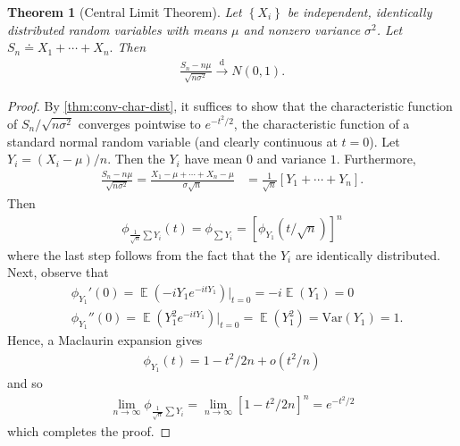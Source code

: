 \documentclass[12pt]{amsbook}
\DeclareMathOperator{\ex}{\mathbb{E}}
\newcommand{\var}{\mathrm{Var}}
\theoremstyle{plain}
\newtheorem{theorem}{Theorem}
\theoremstyle{definition}
\theoremstyle{remark}
\numberwithin{equation}{section}  %
\begin{document}
	\begin{theorem}[Central Limit Theorem]\label{thm:central-limit}
		Let $ \left\{ X_{i} \right\}$ be independent, identically
		distributed random variables with means $\mu$ and nonzero
		variance $\sigma^{2}$. Let $S_{n} \doteq X_{1} + \cdots + X_{n}.$ Then
		\begin{equation*}
			\begin{split}
				\frac{S_{n} - n \mu}{\sqrt{n \sigma^{2}}} \xrightarrow{\text{d}} N(0,1).
			\end{split}
		\end{equation*}
	\end{theorem}
	\begin{proof}
		By \cref{thm:conv-char-dist}, it suffices to show that
		the characteristic function of $S_{n}/\sqrt{n \sigma^{2}}$ converges
		pointwise to  $e^{-t^{2}/2}$, the characteristic function of 
		a standard normal random variable (and clearly
		continuous at $t=0$). Let
		$Y_{i} = (X_{i} - \mu)/n$. Then the $Y_{i}$ have mean $0$ and
		variance $1$. Furthermore, 
		\begin{equation*}
			\begin{split}
				\frac{S_{n} - n \mu}{\sqrt{n \sigma^{2}}}
				= \frac{X_{1} - \mu+ \cdots + X_{n} - \mu}{\sigma \sqrt{n}}
				& = \frac{1}{\sqrt{n}}\left[ Y_{1} + \cdots + Y_{n} \right].
			\end{split}
		\end{equation*}
		Then
		\begin{equation*}
			\begin{split}
				\phi_{\frac{1}{\sqrt{n}}\sum Y_{i}}(t)
				= \phi_{\sum Y_{i}} = \left[ \phi_{Y_{1}}\left( t/\sqrt{n} \right) \right]^{n}
			\end{split}
		\end{equation*}
		where the last step follows from the fact that the $Y_{i}$ are identically
		distributed. Next, observe that
		\begin{equation*}
			\begin{split}
				& \phi_{Y_{1}}'(0) = \ex (-iY_{1} e^{-itY_{1}}) \vert_{t = 0} = -i
				\ex(Y_{1}) = 0
				\\
				& \phi_{Y_{1}}''(0) = \ex(Y_{1}^{2} e^{-itY_{1}}) \vert_{t = 0} = 
				\ex(Y_{1}^{2}) = \var(Y_{1}) = 1.
			\end{split}
		\end{equation*}
		Hence, a Maclaurin expansion gives
		\begin{equation*}
			\begin{split}
				\phi_{Y_{1}}(t) = 1 - t^{2}/2n + o(t^{2}/n)
			\end{split}
		\end{equation*}
		and so
		\begin{equation*}
			\begin{split}
				\lim_{n \to \infty} \phi_{\frac{1}{\sqrt{n}} \sum Y_{i}}
				= \lim_{n \to \infty} \left[ 1 - t^{2}/2n \right]^{n}
				= e^{-t^{2}/2}
			\end{split}
		\end{equation*}
		which completes the proof.
	\end{proof}
\end{document}
